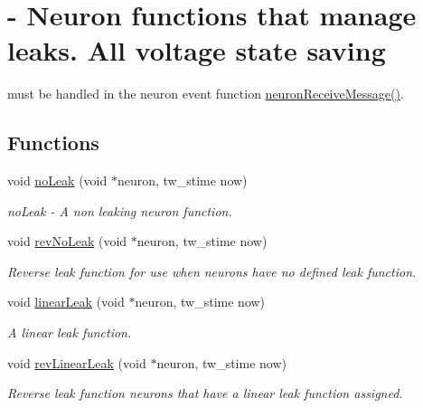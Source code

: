 \hypertarget{group___leak_functions}{}\section{-\/ Neuron functions that manage leaks. All voltage state saving}
\label{group___leak_functions}


must be handled in the neuron event function \hyperlink{neuron_8c_aa6819d7492f0173f2234ba0b8b0bb674}{neuron\+Receive\+Message()}.  


\subsection*{Functions}
\begin{DoxyCompactItemize}
\item 
void \hyperlink{group___leak_functions_ga8e52befc10f975c6be39cc93af573d7e}{no\+Leak} (void $\ast$neuron, tw\+\_\+stime now)
\begin{DoxyCompactList}\small\item\em no\+Leak -\/ A non leaking neuron function. \end{DoxyCompactList}\item 
void \hyperlink{group___leak_functions_gac5bebec77c5216533ec5f6acd086532e}{rev\+No\+Leak} (void $\ast$neuron, tw\+\_\+stime now)
\begin{DoxyCompactList}\small\item\em Reverse leak function for use when neurons have no defined leak function. \end{DoxyCompactList}\item 
void \hyperlink{group___leak_functions_ga64dc379b459a2b07b40bce35381210e8}{linear\+Leak} (void $\ast$neuron, tw\+\_\+stime now)
\begin{DoxyCompactList}\small\item\em A linear leak function. \end{DoxyCompactList}\item 
void \hyperlink{group___leak_functions_ga26ced40d7ad7a0b448a136d8724fe18b}{rev\+Linear\+Leak} (void $\ast$neuron, tw\+\_\+stime now)
\begin{DoxyCompactList}\small\item\em Reverse leak function neurons that have a linear leak function assigned. \end{DoxyCompactList}\end{DoxyCompactItemize}


